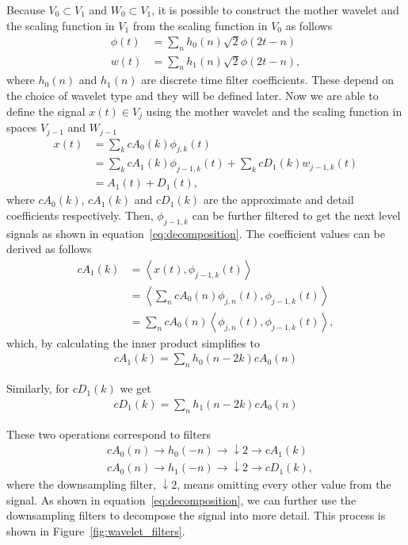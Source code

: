 Because $V_0 \subset V_1$ and $W_0 \subset V_1$, it is possible to construct the mother wavelet and the scaling function in $V_1$ from the scaling function in $V_0$ as follows
\begin{align}
\phi(t) &= \sum_n h_0(n) \sqrt{2} \phi(2t - n) \\
w(t) &= \sum_n h_1(n) \sqrt{2} \phi(2t - n),
\end{align}
where $h_0(n)$ and $h_1(n)$ are discrete time filter coefficients. These depend on the choice of wavelet type and they will be defined later. Now we are able to define the signal $x(t) \in V_j$ using the mother wavelet and the scaling function in spaces $V_{j-1}$ and $W_{j-1}$
\begin{align}
x(t) &= \sum_k cA_0(k) \phi_{j,k}(t) \\
&= \sum_k cA_1(k) \phi_{j-1,k}(t) + \sum_k cD_1(k) w_{j-1,k}(t) \\
&= A_1(t) + D_1(t),
\end{align}
where $cA_0(k)$, $cA_1(k)$ and $cD_1(k)$ are the approximate and detail coefficients respectively. Then, $\phi_{j-1,k}$ can be further filtered to get the next level signals as shown in equation~\ref{eq:decomposition}. The coefficient values can be derived as follows
\begin{align}
cA_1(k) &= \left \langle x(t), \phi_{j-1,k}(t) \right \rangle \\
		&= \left \langle \sum_n cA_0(n) \phi_{j,n}(t), \phi_{j-1,k}(t) \right \rangle \\
		&= \sum_n cA_0(n) \left \langle \phi_{j,n}(t), \phi_{j-1,k}(t) \right \rangle,
\end{align}
which, by calculating the inner product simplifies to
\begin{align}
cA_1(k) = \sum_n h_0(n-2k) cA_0(n)
\end{align}

Similarly, for $cD_1(k)$ we get
\begin{align}
cD_1(k) = \sum_n h_1(n-2k) cA_0(n)
\end{align}

These two operations correspond to filters
\begin{align}
&cA_0(n) \longrightarrow \boxed{h_0(-n)} \longrightarrow \boxed{\downarrow 2} \longrightarrow cA_1(k) \label{eq:downsampling1} \\
&cA_0(n) \longrightarrow \boxed{h_1(-n)} \longrightarrow \boxed{\downarrow 2} \longrightarrow cD_1(k), \label{eq:downsampling2}
\end{align}
where the downsampling filter, $\boxed{\downarrow 2}$, means omitting every other value from the signal. As shown in equation~\ref{eq:decomposition}, we can further use the downsampling filters to decompose the signal into more detail. This process is shown in Figure~\ref{fig:wavelet_filters}.

